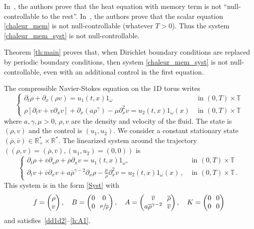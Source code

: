 \documentclass[JEP,XML,SOM,Unicode,NoEqCountersInSection]{cedram}
\theoremstyle{plain}
\theoremstyle{definition}
\theoremstyle{remark}
\newcommand{\set}{\mathbb}
\newcommand{\R}{} %
\renewcommand{\R}{\set{R}}
\newcommand{\T}{\set{T}}
\begin{document}
In~\cite{ivanov_2009}, the authors prove that the heat equation with memory term is not ``null-controllable to the rest''.
In~\cite{guerrero_2013}, the authors prove that the scalar equation \eqref{chaleur_mem} is not null-controllable (whatever $T>0$).
Thus the system \eqref{chaleur_mem_syst} is not null-controllable.

Theorem \ref{th:main} proves that, when Dirichlet boundary conditions are replaced by periodic boundary conditions, then system \eqref{chaleur_mem_syst} is not null-controllable, even with an additional control in the first equation.


The compressible Navier-Stokes equation on the 1D torus writes
\[
\begin{cases}
\partial_t \rho + \partial_x (\rho v) = u_1(t,x) 1_\omega \quad & \text{ in } (0,T)\times\T \\
\rho[\partial_t v + v \partial_x v ] + \partial_x(a \rho^\gamma)- \mu \partial_x^2v = u_2(t,x)1_\omega(x) & \text{ in } (0,T)\times\T
\end{cases}
\]
where $a,\gamma, \mu>0$, $\rho, v$ are the density and velocity of the fluid. The state is $(\rho,v)$ and the control is $(u_1,u_2)$. We consider a constant stationary state $(\overline{\rho},\overline{v}) \in \R^*_+ \times \R^*$. The linearized system around the trajectory $((\rho,v)=(\overline{\rho},\overline{v}),(u_1,u_2)=(0,0))$ is
\begin{equation} \label{NSCL}
\begin{cases}
\partial_t \rho + \overline{v} \partial_x \rho + \overline{\rho}\partial_x v = u_1(t,x) 1_\omega, \ & \text{ in } (0,T)\times\T
\\
\partial_t v + \overline{v} \partial_x v + a \overline{\rho}^{\gamma-2} \partial_x \rho - \frac{\mu}{\overline{\rho}} \partial_x^2 v = u_2(t,x)1_\omega(x)\,, & \text{ in } (0,T)\times\T\,.
\end{cases}
\end{equation}
This system is in the form \eqref{Syst} with
\[\arraycolsep3.5pt
f=\begin{pmatrix}
\rho \\ v
\end{pmatrix}, \quad
B=\begin{pmatrix}
0 & 0 \\ 0 & \sfrac{\mu}{\overline{\rho}}
\end{pmatrix}, \quad
A=\begin{pmatrix}
\overline{v} & \overline{\rho} \\ a \overline{\rho}^{\gamma-2} & \overline{v}
\end{pmatrix}, \quad
K=\begin{pmatrix}
0 & 0 \\ 0 & 0
\end{pmatrix}
\]
and satisfies~\eqref{dd1d2}--\eqref{h:A1}.
\end{document}
